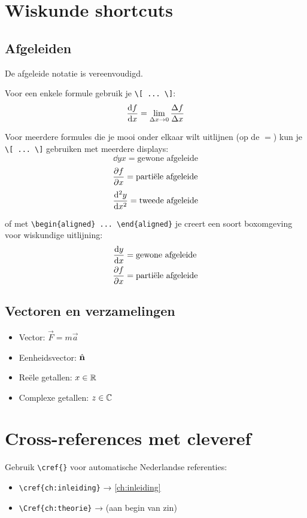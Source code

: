 
\section{Wiskunde shortcuts}

\subsection{Afgeleiden}

De afgeleide notatie is vereenvoudigd.

Voor een enkele formule gebruik je \verb|\[ ... \]|:
\[ \dv{f}{x} = \lim_{\Delta x \to 0} \frac{\Delta f}{\Delta x} \]

Voor meerdere formules die je mooi onder elkaar wilt uitlijnen (op de $=$) kun je \verb|\[ ... \]| gebruiken met meerdere displays:
\[ \dd{y}{x} = \text{gewone afgeleide} \]
\[ \frac{\partial f}{\partial x} = \text{partiële afgeleide} \]
\[ \frac{\mathrm{d}^{2} y}{\mathrm{d} x^{2}} = \text{tweede afgeleide} \]

of met \verb|\begin{aligned} ... \end{aligned}| je creert een soort boxomgeving voor wiskundige uitlijning:
\[
\begin{aligned}
  \frac{\mathrm{d} y}{\mathrm{d} x} &= \text{gewone afgeleide} \\
  \frac{\partial f}{\partial x}  &= \text{partiële afgeleide}
\end{aligned}
\]


\subsection{Vectoren en verzamelingen}

\begin{itemize}
    \item Vector: $\vec{F} = m\vec{a}$
    \item Eenheidsvector: $\hat{\mathbf{n}}$
    \item Reële getallen: $x \in \mathbb{R}$
    \item Complexe getallen: $z \in \mathbb{C}$
\end{itemize}

\section{Cross-references met cleveref}

Gebruik \verb|\cref{}| voor automatische Nederlandse referenties:
\begin{itemize}
    \item \verb|\cref{ch:inleiding}| → \cref{ch:inleiding}
    \item \verb|\Cref{ch:theorie}| →  (aan begin van zin)
\end{itemize}
